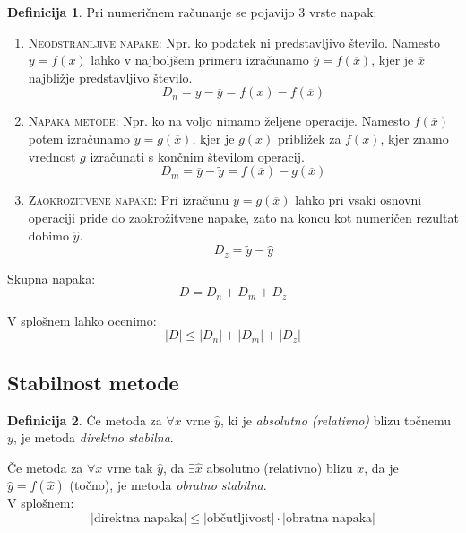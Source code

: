 \documentclass[11pt]{article}
\theoremstyle{definition}
\newtheorem{definicija}{Definicija}[section]
\begin{document}
\begin{definicija}

Pri numeričnem računanje se pojavijo 3 vrste napak:
\begin{enumerate}
	\item \textsc{Neodstranljive napake}: 
	Npr. ko podatek ni predstavljivo število. Namesto $y = f(x)$ lahko v najboljšem primeru izračunamo $\overline{y} = f(\overline{x})$, kjer je $\overline{x}$ najbližje predstavljivo število. 
	$$D_n = y - \overline{y} = f(x) - f(\overline{x})$$
	\item \textsc{Napaka metode}:
	Npr. ko na voljo nimamo željene operacije. Namesto $f(\overline{x})$ potem izračunamo $\widetilde{y}=g(\overline{x})$, kjer je $g(x)$ približek za $f(x)$, kjer znamo vrednost $g$ izračunati s končnim številom operacij. 
	$$D_m = \overline{y} - \widetilde{y} = f(\overline{x}) - g(\overline{x})$$
	\item \textsc{Zaokrožitvene napake}:
	Pri izračunu $\widetilde{y}=g(\overline{x})$ lahko pri vsaki osnovni operaciji pride do zaokrožitvene napake, zato na koncu kot numeričen rezultat dobimo $\widehat{y}$.
	$$D_z = \widetilde{y} - \widehat{y}$$
\end{enumerate}

Skupna napaka:
$$D = D_n + D_m + D_z$$

V splošnem lahko ocenimo:
$$|D| \leq |D_n| + |D_m| + |D_z|$$
\end{definicija}
\vspace{0.5cm}


\subsection{Stabilnost metode}
\vspace{0.5cm}

\begin{definicija}

Če metoda za $\forall x$ vrne $\widehat{y}$, ki je \textit{absolutno (relativno)} blizu točnemu $y$, je metoda \textit{direktno stabilna}.

Če metoda za $\forall x$ vrne tak $\widehat{y}$, da $\exists \widehat{x}$ absolutno (relativno) blizu $x$, da je $\widehat{y}=f(\widehat{x})$ (točno), je metoda \textit{obratno stabilna}. \\

\noindent V splošnem:
$$|\text{direktna napaka}| \leq |\text{občutljivost}| \cdot |\text{obratna napaka}|$$

\end{definicija}
\vspace{0.5cm}
\end{document}
